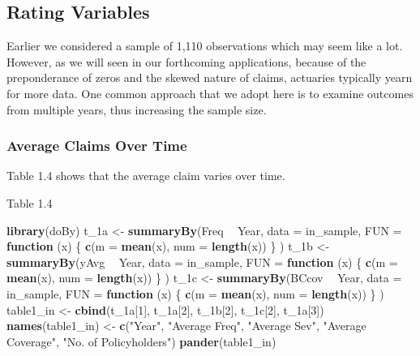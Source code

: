 \documentclass[]{book}
\newenvironment{Shaded}{\begin{snugshade}}{\end{snugshade}}
\newcommand{\KeywordTok}[1]{\textcolor[rgb]{0.13,0.29,0.53}{\textbf{#1}}}
\newcommand{\DataTypeTok}[1]{\textcolor[rgb]{0.13,0.29,0.53}{#1}}
\newcommand{\DecValTok}[1]{\textcolor[rgb]{0.00,0.00,0.81}{#1}}
\newcommand{\StringTok}[1]{\textcolor[rgb]{0.31,0.60,0.02}{#1}}
\newcommand{\ControlFlowTok}[1]{\textcolor[rgb]{0.13,0.29,0.53}{\textbf{#1}}}
\newcommand{\OperatorTok}[1]{\textcolor[rgb]{0.81,0.36,0.00}{\textbf{#1}}}
\newcommand{\NormalTok}[1]{#1}
\theoremstyle{definition}
\theoremstyle{definition}
\theoremstyle{definition}
\theoremstyle{remark}
\begin{document}
\subsection{Rating Variables}\label{rating-variables}

Earlier we considered a sample of 1,110 observations which may seem like
a lot. However, as we will seen in our forthcoming applications, because
of the preponderance of zeros and the skewed nature of claims, actuaries
typically yearn for more data. One common approach that we adopt here is
to examine outcomes from multiple years, thus increasing the sample
size.

\subsubsection{Average Claims Over Time}\label{average-claims-over-time}

Table 1.4 shows that the average claim varies over time.

Table 1.4

\begin{Shaded}
\begin{Highlighting}[]
\KeywordTok{library}\NormalTok{(doBy)}
\NormalTok{t_1a <-}\StringTok{ }\KeywordTok{summaryBy}\NormalTok{(Freq }\OperatorTok{~}\StringTok{ }\NormalTok{Year, }\DataTypeTok{data =}\NormalTok{ in_sample,   }
                 \DataTypeTok{FUN =} \ControlFlowTok{function}\NormalTok{ (x) \{ }\KeywordTok{c}\NormalTok{(}\DataTypeTok{m =} \KeywordTok{mean}\NormalTok{(x), }\DataTypeTok{num =} \KeywordTok{length}\NormalTok{(x)) \} )}
\NormalTok{t_1b <-}\StringTok{ }\KeywordTok{summaryBy}\NormalTok{(yAvg }\OperatorTok{~}\StringTok{ }\NormalTok{Year, }\DataTypeTok{data =}\NormalTok{ in_sample,   }
                 \DataTypeTok{FUN =} \ControlFlowTok{function}\NormalTok{ (x) \{ }\KeywordTok{c}\NormalTok{(}\DataTypeTok{m =} \KeywordTok{mean}\NormalTok{(x), }\DataTypeTok{num =} \KeywordTok{length}\NormalTok{(x)) \} )}
\NormalTok{t_1c <-}\StringTok{ }\KeywordTok{summaryBy}\NormalTok{(BCcov }\OperatorTok{~}\StringTok{ }\NormalTok{Year, }\DataTypeTok{data =}\NormalTok{ in_sample,   }
                 \DataTypeTok{FUN =} \ControlFlowTok{function}\NormalTok{ (x) \{ }\KeywordTok{c}\NormalTok{(}\DataTypeTok{m =} \KeywordTok{mean}\NormalTok{(x), }\DataTypeTok{num =} \KeywordTok{length}\NormalTok{(x)) \} )}
\NormalTok{table1_in <-}\StringTok{ }\KeywordTok{cbind}\NormalTok{(t_1a[}\DecValTok{1}\NormalTok{], t_1a[}\DecValTok{2}\NormalTok{], t_1b[}\DecValTok{2}\NormalTok{], t_1c[}\DecValTok{2}\NormalTok{], t_1a[}\DecValTok{3}\NormalTok{])}
\KeywordTok{names}\NormalTok{(table1_in) <-}\StringTok{ }\KeywordTok{c}\NormalTok{(}\StringTok{"Year"}\NormalTok{, }\StringTok{"Average Freq"}\NormalTok{, }\StringTok{"Average Sev"}\NormalTok{, }\StringTok{"Average Coverage"}\NormalTok{, }
                      \StringTok{"No. of Policyholders"}\NormalTok{)}
\KeywordTok{pander}\NormalTok{(table1_in)}
\end{Highlighting}
\end{Shaded}
\end{document}
